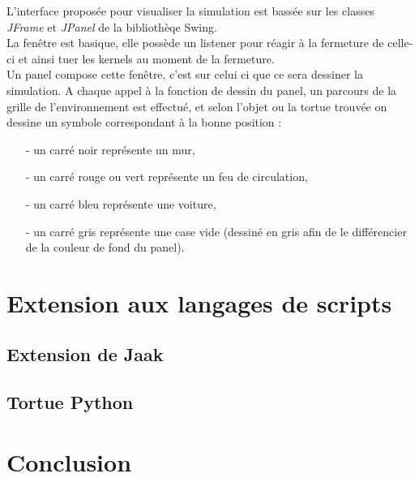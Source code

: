\documentclass[a4paper,12pt]{report}
\begin{document}
L'interface proposée pour visualiser la simulation est bassée sur les classes \emph{JFrame} et \emph{JPanel} de la bibliothèqe Swing. \\

La fenêtre est basique, elle possède un listener pour réagir à la fermeture de celle-ci et ainsi tuer les kernels au moment de la fermeture.\\

Un panel compose cette fenêtre, c'est sur celui ci que ce sera dessiner la simulation. A chaque appel à la fonction de dessin du panel, un parcours de la grille de l'environnement est effectué, et selon l'objet ou la tortue trouvée on dessine un symbole correspondant à la bonne position :
\begin{itemize}
\item[-]un carré noir représente un mur,
\item[-]un carré rouge ou vert représente un feu de circulation,
\item[-]un carré bleu représente une voiture,
\item[-]un carré gris représente une case vide (dessiné en gris afin de le différencier de la couleur de fond du panel).
\end{itemize}


\chapter{Extension aux langages de scripts}

\section{Extension de Jaak}

\section{Tortue Python}

\chapter{Conclusion}
\end{document}
